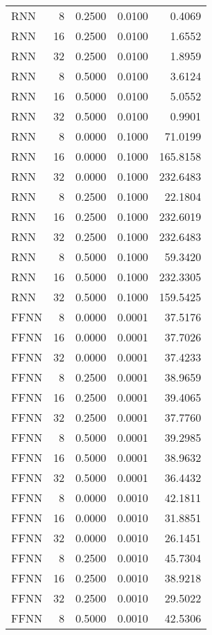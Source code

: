 \begin{table}[h!]
\begin{adjustbox}{max width=\textwidth}
\begin{tabular}{lrrrr}
  RNN &     8 & 0.2500 & 0.0100 & 0.4069 \\ 
  RNN &    16 & 0.2500 & 0.0100 & 1.6552 \\ 
  RNN &    32 & 0.2500 & 0.0100 & 1.8959 \\ 
  RNN &     8 & 0.5000 & 0.0100 & 3.6124 \\ 
  RNN &    16 & 0.5000 & 0.0100 & 5.0552 \\ 
  RNN &    32 & 0.5000 & 0.0100 & 0.9901 \\ 
  RNN &     8 & 0.0000 & 0.1000 & 71.0199 \\ 
  RNN &    16 & 0.0000 & 0.1000 & 165.8158 \\ 
  RNN &    32 & 0.0000 & 0.1000 & 232.6483 \\ 
  RNN &     8 & 0.2500 & 0.1000 & 22.1804 \\ 
  RNN &    16 & 0.2500 & 0.1000 & 232.6019 \\ 
  RNN &    32 & 0.2500 & 0.1000 & 232.6483 \\ 
  RNN &     8 & 0.5000 & 0.1000 & 59.3420 \\ 
  RNN &    16 & 0.5000 & 0.1000 & 232.3305 \\ 
  RNN &    32 & 0.5000 & 0.1000 & 159.5425 \\ 
  FFNN &     8 & 0.0000 & 0.0001 & 37.5176 \\ 
  FFNN &    16 & 0.0000 & 0.0001 & 37.7026 \\ 
  FFNN &    32 & 0.0000 & 0.0001 & 37.4233 \\ 
  FFNN &     8 & 0.2500 & 0.0001 & 38.9659 \\ 
  FFNN &    16 & 0.2500 & 0.0001 & 39.4065 \\ 
  FFNN &    32 & 0.2500 & 0.0001 & 37.7760 \\ 
  FFNN &     8 & 0.5000 & 0.0001 & 39.2985 \\ 
  FFNN &    16 & 0.5000 & 0.0001 & 38.9632 \\ 
  FFNN &    32 & 0.5000 & 0.0001 & 36.4432 \\ 
  FFNN &     8 & 0.0000 & 0.0010 & 42.1811 \\ 
  FFNN &    16 & 0.0000 & 0.0010 & 31.8851 \\ 
  FFNN &    32 & 0.0000 & 0.0010 & 26.1451 \\ 
  FFNN &     8 & 0.2500 & 0.0010 & 45.7304 \\ 
  FFNN &    16 & 0.2500 & 0.0010 & 38.9218 \\ 
  FFNN &    32 & 0.2500 & 0.0010 & 29.5022 \\ 
  FFNN &     8 & 0.5000 & 0.0010 & 42.5306 \\ 

\end{tabular}
\end{adjustbox}
\end{table}
